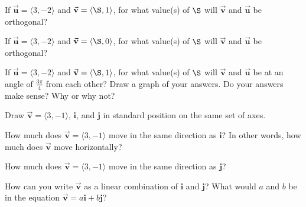 \bq If $\vec{\textbf{u}}=\langle 3,-2\rangle$ and $\vec{\textbf{v}}=\langle \S,1\rangle$, for what value(s) of $\S$ will $\vec{\textbf{v}}$ and $\vec{\textbf{u}}$ be orthogonal?
\eq

\bq If $\vec{\textbf{u}}=\langle 3,-2\rangle$ and $\vec{\textbf{v}}=\langle \S,0\rangle$, for what value(s) of $\S$ will $\vec{\textbf{v}}$ and $\vec{\textbf{u}}$ be orthogonal?
\eq

\bq If $\vec{\textbf{u}}=\langle 3,-2\rangle$ and $\vec{\textbf{v}}=\langle \S,1\rangle$, for what value(s) of $\S$ will $\vec{\textbf{v}}$ and $\vec{\textbf{u}}$ be at an angle of $\frac{3 \pi}{4}$ from each other? Draw a graph of your answers. Do your answers make sense? Why or why not?
\eq

\bq\label{wert} \be
\item Draw $\vec{\textbf{v}}=\langle 3,-1\rangle$, $\textbf{i}$, and $\textbf{j}$ in standard position on the same set of axes.
\item How much does $\vec{\textbf{v}}=\langle 3,-1\rangle$ move in the same direction as $\textbf{i}$? In other words, how much does $\vec{\textbf{v}}$ move horizontally?
\item How much does $\vec{\textbf{v}}=\langle 3,-1\rangle$ move in the same direction as $\textbf{j}$?
\item How can you write $\vec{\textbf{v}}$ as a linear combination of $\textbf{i}$ and $\textbf{j}$? What would $a$ and $b$ be in the equation $\vec{\textbf{v}}= a \textbf{i}+b \textbf{j}$?
\ee
\eq

